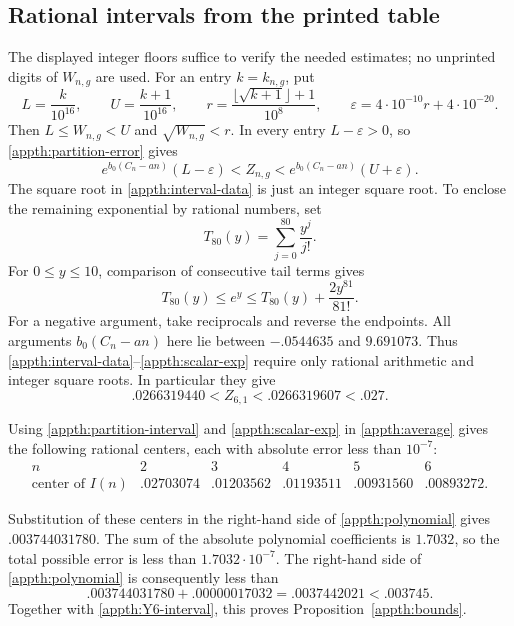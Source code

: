 \documentclass[11pt]{article}
\theoremstyle{remark}
\numberwithin{equation}{section}
\begin{document}
\subsection{Rational intervals from the printed table}

The displayed integer floors suffice to verify the needed estimates; no
unprinted digits of $W_{n,g}$ are used. For an entry $k=k_{n,g}$, put
\begin{equation}\label{appth:interval-data}
 L=\frac{k}{10^{16}},\qquad U=\frac{k+1}{10^{16}},\qquad
 r=\frac{\lfloor\sqrt{k+1}\rfloor+1}{10^8},\qquad
 \varepsilon=4\cdot10^{-10}r+4\cdot10^{-20}.
\end{equation}
Then $L\le W_{n,g}<U$ and $\sqrt{W_{n,g}}<r$. In every entry
$L-\varepsilon>0$, so \eqref{appth:partition-error} gives
\begin{equation}\label{appth:partition-interval}
 e^{b_0(C_n-an)}(L-\varepsilon)
       <Z_{n,g}<e^{b_0(C_n-an)}(U+\varepsilon).
\end{equation}
The square root in \eqref{appth:interval-data} is just an integer square
root. To enclose the remaining exponential by rational numbers, set
\[
 T_{80}(y)=\sum_{j=0}^{80}\frac{y^j}{j!}.
\]
For $0\le y\le10$, comparison of consecutive tail terms gives
\begin{equation}\label{appth:scalar-exp}
 T_{80}(y)\le e^y
       \le T_{80}(y)+\frac{2y^{81}}{81!}.
\end{equation}
For a negative argument, take reciprocals and reverse the endpoints.
All arguments $b_0(C_n-an)$ here lie between $-.0544635$ and $9.691073$.
Thus \eqref{appth:interval-data}--\eqref{appth:scalar-exp} require only
rational arithmetic and integer square roots. In particular they give
\begin{equation}\label{appth:Y6-interval}
 .0266319440<Z_{6,1}<.0266319607<.027.
\end{equation}

Using \eqref{appth:partition-interval} and \eqref{appth:scalar-exp} in
\eqref{appth:average} gives the following rational centers, each with
absolute error less than $10^{-7}$:
\begin{equation}\label{appth:moment-centers}
\begin{array}{c|ccccc}
 n&2&3&4&5&6\\\hline
 \text{center of }I(n)
 &.02703074&.01203562&.01193511&.00931560&.00893272.
\end{array}
\end{equation}

Substitution of these centers in the right-hand side of
\eqref{appth:polynomial} gives $.003744031780$. The sum of the absolute
polynomial coefficients is $1.7032$, so the total possible error is less
than $1.7032\cdot10^{-7}$. The right-hand side of
\eqref{appth:polynomial} is consequently less than
\[
 .003744031780+.00000017032=.0037442021<.003745.
\]
Together with \eqref{appth:Y6-interval}, this proves
Proposition~\ref{appth:bounds}.
\end{document}
